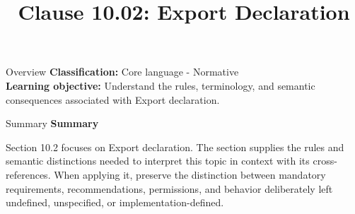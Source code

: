 \documentclass[10pt,letterpaper]{article}
\title{Clause 10.02: Export Declaration}
\author{}
\date{}
\begin{document}
\maketitle
\begin{CornellOverviewBox}{Overview}
\textbf{Classification:} Core language - Normative\\[2pt]
\textbf{Learning objective:} Understand the rules, terminology, and semantic consequences associated with Export declaration.
\end{CornellOverviewBox}\begin{CornellSummaryBox}{Summary}
{\sffamily\bfseries\color{Accent} Summary}\par\vspace{3pt}Section 10.2 focuses on Export declaration. The section supplies the rules and semantic distinctions needed to interpret this topic in context with its cross-references. When applying it, preserve the distinction between mandatory requirements, recommendations, permissions, and behavior deliberately left undefined, unspecified, or implementation-defined.
\end{CornellSummaryBox}
\end{document}
